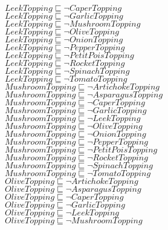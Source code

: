 \documentclass[a4paper,10pt]{article}
\begin{document}
 $LeekTopping \sqsubseteq  \lnot CaperTopping$\\ 
 $LeekTopping \sqsubseteq  \lnot GarlicTopping$\\ 
 $LeekTopping \sqsubseteq  \lnot MushroomTopping$\\ 
 $LeekTopping \sqsubseteq  \lnot OliveTopping$\\ 
 $LeekTopping \sqsubseteq  \lnot OnionTopping$\\ 
 $LeekTopping \sqsubseteq  \lnot PepperTopping$\\ 
 $LeekTopping \sqsubseteq  \lnot PetitPoisTopping$\\ 
 $LeekTopping \sqsubseteq  \lnot RocketTopping$\\ 
 $LeekTopping \sqsubseteq  \lnot SpinachTopping$\\ 
 $LeekTopping \sqsubseteq  \lnot TomatoTopping$\\ 
 $MushroomTopping \sqsubseteq  \lnot ArtichokeTopping$\\ 
 $MushroomTopping \sqsubseteq  \lnot AsparagusTopping$\\ 
 $MushroomTopping \sqsubseteq  \lnot CaperTopping$\\ 
 $MushroomTopping \sqsubseteq  \lnot GarlicTopping$\\ 
 $MushroomTopping \sqsubseteq  \lnot LeekTopping$\\ 
 $MushroomTopping \sqsubseteq  \lnot OliveTopping$\\ 
 $MushroomTopping \sqsubseteq  \lnot OnionTopping$\\ 
 $MushroomTopping \sqsubseteq  \lnot PepperTopping$\\ 
 $MushroomTopping \sqsubseteq  \lnot PetitPoisTopping$\\ 
 $MushroomTopping \sqsubseteq  \lnot RocketTopping$\\ 
 $MushroomTopping \sqsubseteq  \lnot SpinachTopping$\\ 
 $MushroomTopping \sqsubseteq  \lnot TomatoTopping$\\ 
 $OliveTopping \sqsubseteq  \lnot ArtichokeTopping$\\ 
 $OliveTopping \sqsubseteq  \lnot AsparagusTopping$\\ 
 $OliveTopping \sqsubseteq  \lnot CaperTopping$\\ 
 $OliveTopping \sqsubseteq  \lnot GarlicTopping$\\ 
 $OliveTopping \sqsubseteq  \lnot LeekTopping$\\ 
 $OliveTopping \sqsubseteq  \lnot MushroomTopping$\\ 
\end{document}
